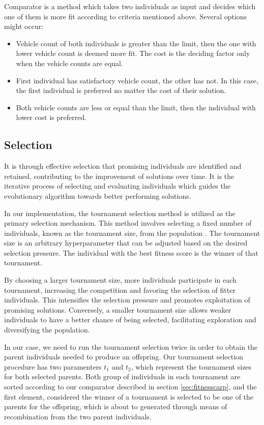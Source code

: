 \documentclass[twoside]{ctuthesis}
\theoremstyle{plain}
\theoremstyle{definition}
\theoremstyle{note}
\begin{document}
Comparator is a method which takes two individuals as input and decides which one of them is more fit according to criteria mentioned above. Several options might occur:
\begin{itemize}
	\item Vehicle count of both individuals is greater than the limit, then the one with lower vehicle count is deemed more fit. The cost is the deciding factor only when the vehicle counts are equal.
	\item First individual has satisfactory vehicle count, the other has not. In this case, the first individual is preferred no matter the cost of their solution.
	\item Both vehicle counts are less or equal than the limit, then the individual with lower cost is preferred.
\end{itemize}

\subsection{Selection}
\label{sec:selectioncarp}
It is through effective selection that promising individuals are identified and retained, contributing to the improvement of solutions over time. It is the iterative process of selecting and evaluating individuals which guides the evolutionary algorithm towards better performing solutions.

In our implementation, the tournament selection method is utilized as the primary selection mechanism. This method involves selecting a fixed number of individuals, known as the tournament size, from the population \cite{miller1995genetic}. The tournament size is an arbitrary hyperparameter that can be adjusted based on the desired selection pressure. The individual with the best fitness score is the winner of that tournament.

By choosing a larger tournament size, more individuals participate in each tournament, increasing the competition and favoring the selection of fitter individuals. This intensifies the selection pressure and promotes exploitation of promising solutions. Conversely, a smaller tournament size allows weaker individuals to have a better chance of being selected, facilitating exploration and diversifying the population.

In our case, we need to run the tournament selection twice in order to obtain the parent individuals needed to produce an offspring. Our tournament selection procedure has two paramenters \emph{$t_1$} and \emph{$t_2$}, which represent the tournament sizes for both selected parents. Both group of individuals in each tournament are sorted according to our comparator described in section \ref{sec:fitnesscarp}, and the first element, considered the winner of a tournament is selected to be one of the parents for the offspring, which is about to generated through means of recombination from the two parent individuals.
\end{document}
